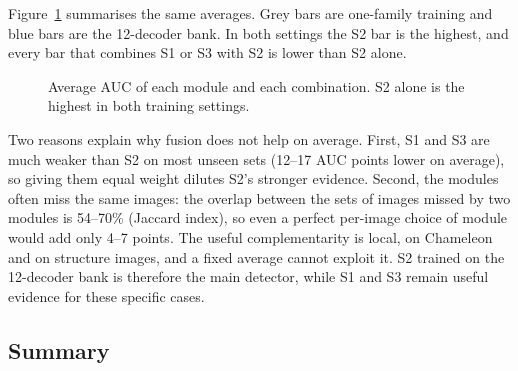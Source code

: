Figure~\ref{fig:fusion} summarises the same averages. Grey bars are one-family training and blue bars are the 12-decoder bank. In both settings the S2 bar is the highest, and every bar that combines S1 or S3 with S2 is lower than S2 alone.

\begin{figure}[H]
\centering
{}
\caption{Average AUC of each module and each combination. S2 alone is the highest in both training settings.}
\label{fig:fusion}
\end{figure}

Two reasons explain why fusion does not help on average. First, S1 and S3 are much weaker than S2 on most unseen sets (12--17 AUC points lower on average), so giving them equal weight dilutes S2's stronger evidence. Second, the modules often miss the same images: the overlap between the sets of images missed by two modules is 54--70\% (Jaccard index), so even a perfect per-image choice of module would add only 4--7 points. The useful complementarity is local, on Chameleon and on structure images, and a fixed average cannot exploit it. S2 trained on the 12-decoder bank is therefore the main detector, while S1 and S3 remain useful evidence for these specific cases.

\subsection{Summary}

